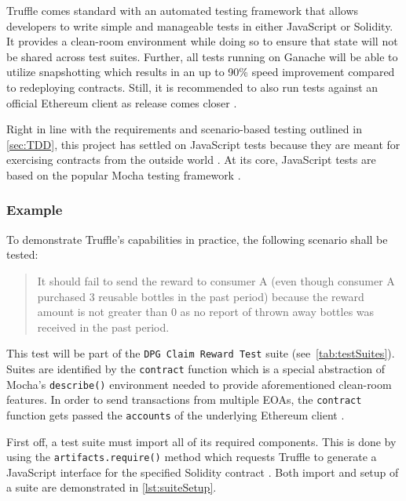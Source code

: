 Truffle comes standard with an automated testing framework that allows developers to write simple and manageable tests in either JavaScript or Solidity. It provides a clean-room environment while doing so to ensure that state will not be shared across test suites. Further, all tests running on Ganache will be able to utilize snapshotting which results in an up to 90\% speed improvement compared to redeploying contracts. Still, it is recommended to also run tests against an official Ethereum client as release comes closer \cite[Testing Your Contracts]{truffleSuite}. 

Right in line with the requirements and scenario-based testing outlined in \autoref{sec:TDD}, this project has settled on JavaScript tests because they are meant for exercising contracts from the outside world \cite[Testing Your Contracts]{truffleSuite}. At its core, JavaScript tests are based on the popular Mocha testing framework \cite[Writing Tests in JavaScript]{truffleSuite}. 

\subsubsection{Example}
To demonstrate Truffle's capabilities in practice, the following scenario shall be tested:

\begin{quotation}
It should fail to send the reward to consumer A (even though consumer A purchased 3 reusable bottles in the past period) because the reward amount is not greater than 0 as no report of thrown away bottles was received in the past period.
\end{quotation}

This test will be part of the \texttt{DPG Claim Reward Test} suite (see~\autoref{tab:testSuites}). Suites are identified by the \texttt{contract} function which is a special abstraction of Mocha's \texttt{describe()} environment needed to provide aforementioned clean-room features. In order to send transactions from multiple \acp{EOA}, the \texttt{contract} function gets passed the \texttt{accounts} of the underlying Ethereum client \cite[Writing Tests in JavaScript]{truffleSuite}.

First off, a test suite must import all of its required components. This is done by using the \texttt{artifacts.require()} method which requests Truffle to generate a JavaScript interface for the specified Solidity contract \cite[Writing Tests in JavaScript]{truffleSuite}. Both import and setup of a suite are demonstrated in \autoref{lst:suiteSetup}.

